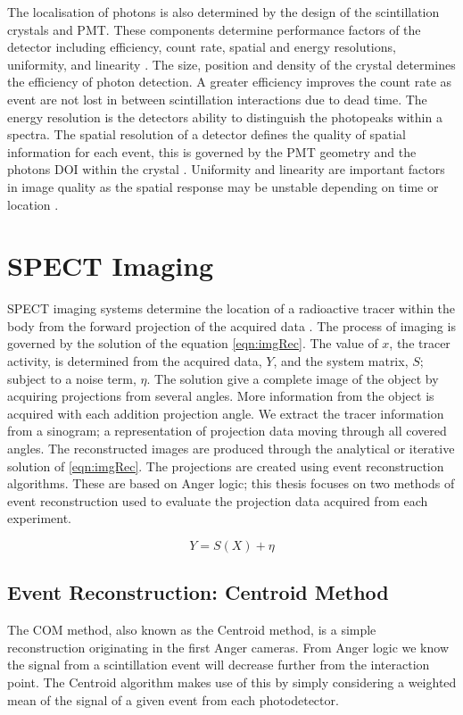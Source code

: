 The localisation of photons is also determined by the design of the scintillation crystals and \acrshort{PMT}. These components determine performance factors of the detector including efficiency, count rate, spatial and energy resolutions, uniformity, and linearity \cite{Anger1966SensitivityCamera} \cite{Sorenson1987}. The size, position and density of the crystal determines the efficiency of photon detection. A greater efficiency improves the count rate as event are not lost in between scintillation interactions due to dead time. The energy resolution is the detectors ability to distinguish the photopeaks within a spectra. The spatial resolution of a detector defines the quality of spatial information for each event, this is governed by the \acrshort{PMT} geometry and the photons \acrlong{DOI} within the crystal \cite{Morrocchi2017}. Uniformity and linearity are important factors in image quality as the spatial response may be unstable depending on time or location \cite{LyraGeorgosopoulouRoutineInstrumentation}.

\section{SPECT Imaging} %
\acrshort{SPECT} imaging systems determine the location of a radioactive tracer within the body from the forward projection of the acquired data \cite{BasicOfNM}. The process of imaging is governed by the solution of the equation \ref{eqn:imgRec}. The value of $x$, the tracer activity, is determined from the acquired data, $Y$, and the system matrix, $S$; subject to a noise term, $\eta$. The solution give a complete image of the object by acquiring projections from several angles. More information from the object is acquired with each addition projection angle. We extract the tracer information from a sinogram; a representation of projection data moving through all covered angles. The reconstructed images are produced through the analytical or iterative solution of \ref{eqn:imgRec}. The projections are created using event reconstruction algorithms. These are based on Anger logic; this thesis focuses on two methods of event reconstruction used to evaluate the projection data acquired from each experiment.

\begin{equation} \label{eqn:imgRec}
        Y = S(X) + \eta 
\end{equation}

\subsection{Event Reconstruction: Centroid Method}
The \acrlong{COM} method, also known as the Centroid method, is a simple reconstruction originating in the first Anger cameras. From Anger logic we know the signal from a scintillation event will decrease further from the interaction point. The Centroid algorithm makes use of this by simply considering a weighted mean of the signal of a given event from each photodetector. 

